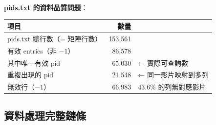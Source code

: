 \documentclass[12pt, a4paper]{article}
\begin{document}
\textbf{pids.txt 的資料品質問題}：

\begin{center}
\begin{tabular}{lrl}
\toprule
\textbf{項目} & \textbf{數量} & \\
\midrule
pids.txt 總行數（= 矩陣行數） & 153,561 & \\
有效 entries（非 $-1$）        & 86,578  & \\
\quad 其中唯一有效 pid          & 65,030  & ← 實際可查詢數 \\
\quad 重複出現的 pid           & 21,548  & ← 同一影片映射到多列 \\
無效行（$-1$）                 & 66,983  & 43.6\% 的列無對應影片 \\
\bottomrule
\end{tabular}
\end{center}

\subsection{資料處理完整鏈條}
\end{document}
